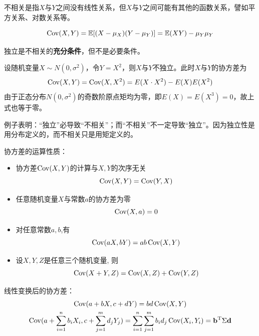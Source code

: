 \begin{remark}
    不相关是指$X$与$Y$之间没有线性关系，但$X$与$Y$之间可能有其他的函数关系，譬如平方关系、对数关系等。
\end{remark}

\begin{proposition}
    \[ \operatorname{Cov} (X,Y)=\mathbb{E}[(X-\mu_X)(Y-\mu_Y)]=\mathbb{E}(XY)-\mu_Y \mu_Y \]
\end{proposition}

\begin{proposition}
    独立是不相关的\textbf{充分条件}，但不是必要条件。
\end{proposition}
\begin{example}\label{exam:3.4.6}
    设随机变量$X \sim N(0,\sigma^2)$，令$Y=X^2$，则$X$与$Y$不独立。此时$X$与$Y$的协方差为
    \[ \operatorname{Cov}(X, Y)=\operatorname{Cov}(X, X^2)=E(X\cdot X^2)-E(X)E(X^2) \]
    由于正态分布$N(0,\sigma^2)$的奇数阶原点矩均为零，即$E(X)=E(X^3)=0$，故上式也等于零。

    例子表明：“独立”必导致“不相关”；而“不相关”不一定导致“独立”。因为独立性是用分布定义的，而不相关只是用矩定义的。
\end{example}

\begin{proposition}\label{prop:cov_property}
    协方差的运算性质：
    \begin{itemize}
        \item 协方差$\operatorname{Cov}(X,Y)$的计算与$X,Y$的次序无关
              \[ \operatorname{Cov}(X,Y)=\operatorname{Cov}(Y,X) \]
        \item 任意随机变量$X$与常数$a$的协方差为零
              \[ \operatorname{Cov}(X,a)=0 \]
        \item 对任意常数$a,b$,有
              \[ \operatorname{Cov}(a X, b Y)=a b \operatorname{Cov}(X, Y) \]
        \item 设$X,Y,Z$是任意三个随机变量, 则
              \[ \operatorname{Cov}(X+Y, Z)=\operatorname{Cov}(X, Z)+\operatorname{Cov}(Y, Z) \]
    \end{itemize}
\end{proposition}

\begin{corollary}
    线性变换后的协方差：
    \begin{gather*}
        \operatorname{Cov}(a+ b X,c +d Y)  = b d \operatorname{Cov}(X,Y)\\
        \operatorname{Cov}(a+\sum_{i=1}^n b_i X_i,c+\sum_{j=1}^m d_j Y_j) = \sum_{i=1}^n\sum_{j=1}^m b_i d_j \operatorname{Cov}(X_i,Y_i) = \mathbf{b}^{\mathrm{T}}\Sigma \mathbf{d}
    \end{gather*}
\end{corollary}

